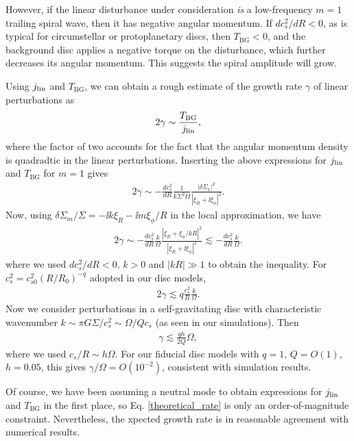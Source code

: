 However, if the linear disturbance under consideration \emph{is} a
low-frequency $m=1$ 
trailing spiral wave, then it has negative angular
momentum. If $dc_s^2/dR<0$, as is typical for circumstellar or
protoplanetary discs, then $T_\mathrm{BG}<0$, and the background disc
applies a negative torque on the disturbance, which further decreases
its angular momentum. This suggests the spiral amplitude will grow.  


Using $j_\mathrm{lin}$ and $T_\mathrm{BG}$, we can obtain a rough estimate of
the growth rate $\gamma$ of linear perturbations as  
\begin{align}
  2\gamma \sim \frac{T_\mathrm{BG}}{j_\mathrm{lin}},
\end{align}
where the factor of two accounts for the fact that the angular momentum
density is quadradtic in the linear perturbations. Inserting the above
expressions for $j_\mathrm{lin}$ and $T_\mathrm{BG}$ for $m=1$ gives
\begin{align}
  2\gamma \sim
  -\frac{dc_s^2}{dR}\frac{1}{k\Sigma^2\Omega}\frac{|\delta\Sigma_1|^2}{|\xi_R
    + \ii\xi_\phi|^2}.
\end{align}
Now, using $\delta\Sigma_m/\Sigma = -\ii k \xi_R - \ii m \xi_\phi/R$
in the local approximation, we have
\begin{align}
  2\gamma \sim -\frac{dc_s^2}{dR}\frac{k}{\Omega}\frac{|\xi_R +
    \xi_\phi/kR|^2}{|\xi_R + \ii \xi_\phi|^2}
  \lesssim -\frac{dc_s^2}{dR}\frac{k}{\Omega}.
\end{align}
where we used $dc_s^2/dR <0$, $k>0$ and $|kR|\gg 1$ to obtain the
inequality. For $c_s^2 = c_{s0}^2 (R/R_0)^{-q}$ adopted in our disc
models,
\begin{align}\label{theoretical_rate}
  2\gamma \lesssim q\frac{c_s^2}{R}\frac{k}{\Omega}. 
\end{align}
Now we consider perturbations in a self-gravitating disc with characteristic
wavenumber $k \sim \pi G \Sigma/c_s^2 \sim \Omega/Q c_s$ (as seen in
our simulations). Then
\begin{align}
  \gamma \lesssim \frac{qh}{2Q}\Omega,
\end{align}
where we used $c_s/R\sim h\Omega$. For our fiducial disc models with
$q=1$, $Q=O(1)$, $h=0.05$, this gives $\gamma/\Omega = O(10^{-2})$,
consistent with simulation results. 

Of course, we have been assuming a neutral mode to obtain expressions
for $j_\mathrm{lin}$ and $T_\mathrm{BG}$ in the first place, so
Eq. \ref{theoretical_rate} is only an order-of-magnitude
constraint. Nevertheless, the xpected growth rate is in reasonable
agreement with numerical results. 

